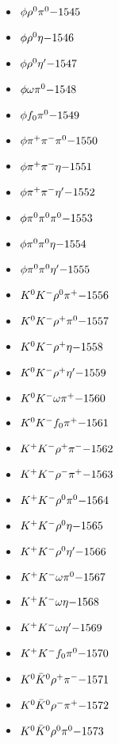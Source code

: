 \begin{multicols}{3}
\begin{itemize}
 \item $ \phi \rho^{0} \pi^{0} \hfill{-1545}$
 \item $ \phi \rho^{0} \eta \hfill{-1546}$
 \item $ \phi \rho^{0} {\eta^{\prime}} \hfill{-1547}$
 \item $ \phi \omega \pi^{0} \hfill{-1548}$
 \item $ \phi f_{0} \pi^{0} \hfill{-1549}$
 \item $ \phi \pi^{+} \pi^{-} \pi^{0} \hfill{-1550}$
 \item $ \phi \pi^{+} \pi^{-} \eta \hfill{-1551}$
 \item $ \phi \pi^{+} \pi^{-} {\eta^{\prime}} \hfill{-1552}$
 \item $ \phi \pi^{0} \pi^{0} \pi^{0} \hfill{-1553}$
 \item $ \phi \pi^{0} \pi^{0} \eta \hfill{-1554}$
 \item $ \phi \pi^{0} \pi^{0} {\eta^{\prime}} \hfill{-1555}$
 \item $ K^{0} K^{-} \rho^{0} \pi^{+} \hfill{-1556}$
 \item $ K^{0} K^{-} \rho^{+} \pi^{0} \hfill{-1557}$
 \item $ K^{0} K^{-} \rho^{+} \eta \hfill{-1558}$
 \item $ K^{0} K^{-} \rho^{+} {\eta^{\prime}} \hfill{-1559}$
 \item $ K^{0} K^{-} \omega \pi^{+} \hfill{-1560}$
 \item $ K^{0} K^{-} f_{0} \pi^{+} \hfill{-1561}$
 \item $ K^{+} K^{-} \rho^{+} \pi^{-} \hfill{-1562}$
 \item $ K^{+} K^{-} \rho^{-} \pi^{+} \hfill{-1563}$
 \item $ K^{+} K^{-} \rho^{0} \pi^{0} \hfill{-1564}$
 \item $ K^{+} K^{-} \rho^{0} \eta \hfill{-1565}$
 \item $ K^{+} K^{-} \rho^{0} {\eta^{\prime}} \hfill{-1566}$
 \item $ K^{+} K^{-} \omega \pi^{0} \hfill{-1567}$
 \item $ K^{+} K^{-} \omega \eta \hfill{-1568}$
 \item $ K^{+} K^{-} \omega {\eta^{\prime}} \hfill{-1569}$
 \item $ K^{+} K^{-} f_{0} \pi^{0} \hfill{-1570}$
 \item $ K^{0} \bar{K}^{0} \rho^{+} \pi^{-} \hfill{-1571}$
 \item $ K^{0} \bar{K}^{0} \rho^{-} \pi^{+} \hfill{-1572}$
 \item $ K^{0} \bar{K}^{0} \rho^{0} \pi^{0} \hfill{-1573}$

\end{itemize}
\end{multicols}
